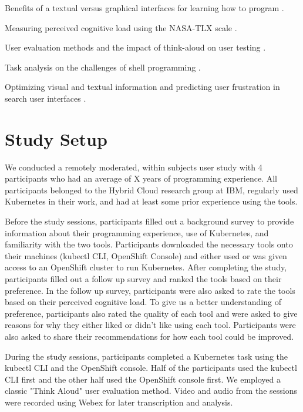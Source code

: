 \documentclass[11pt, oneside]{article}   	%
\begin{document}
Benefits of a textual versus graphical interfaces for learning how to program \cite{dillon2012comparing}.

Measuring perceived cognitive load using the NASA-TLX scale \cite{hart1988development}.

User evaluation methods and the impact of think-aloud on user testing \cite{mcdonald2020impact, ericsson1984protocol, fox2011procedures}. 

Task analysis on the challenges of shell programming \cite{gandhi2020lightening}.

Optimizing visual and textual information and predicting user frustration in search user interfaces \cite{treharne2012optimising, feild2010predicting}.


\section{Study Setup}
We conducted a remotely moderated, within subjects user study with 4 participants who had an average of X years of programming experience. All participants belonged to the Hybrid Cloud research group at IBM, regularly used Kubernetes in their work, and had at least some prior experience using the tools. 

Before the study sessions, participants filled out a background survey to provide information about their programming experience, use of Kubernetes, and familiarity with the two tools. Participants downloaded the necessary tools onto their machines (kubectl CLI, OpenShift Console) and either used or was given access to an OpenShift cluster to run Kubernetes. After completing the study, participants filled out a follow up survey and ranked the tools based on their preference. In the follow up survey, participants were also asked to rate the tools based on their perceived cognitive load. To give us a better understanding of preference, participants also rated the quality of each tool and were asked to give reasons for why they either liked or didn’t like using each tool. Participants were also asked to share their recommendations for how each tool could be improved.

During the study sessions, participants completed a Kubernetes task using the kubectl CLI and the OpenShift console. Half of the participants used the kubectl CLI first and the other half used the OpenShift console first. We employed a classic "Think Aloud" user evaluation method. Video and audio from the sessions were recorded using Webex for later transcription and analysis. 
\end{document}

